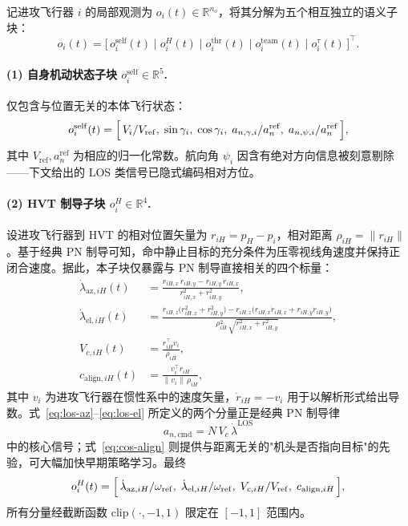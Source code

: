 记进攻飞行器 $i$ 的局部观测为 $o_i(t)\in\mathbb{R}^{n_o}$，将其分解为五个相互独立的语义子块：
\begin{equation}
o_i(t)=\bigl[\,o_i^{\mathrm{self}}(t)\;\big|\;o_i^{H}(t)\;\big|\;o_i^{\mathrm{thr}}(t)\;\big|\;o_i^{\mathrm{team}}(t)\;\big|\;o_i^{\tau}(t)\,\bigr]^{\top}.
\label{eq:obs-decomp}
\end{equation}

\paragraph{(1) 自身机动状态子块 $o_i^{\mathrm{self}}\in\mathbb{R}^{5}$.}
仅包含与位置无关的本体飞行状态：
\begin{equation}
o_i^{\mathrm{self}}(t)=\Bigl[\,V_i/V_{\mathrm{ref}},\;\sin\gamma_i,\;\cos\gamma_i,\;a_{n,\gamma,i}/a^{\mathrm{ref}}_n,\;a_{n,\psi,i}/a^{\mathrm{ref}}_n\,\Bigr],
\label{eq:obs-self}
\end{equation}
其中 $V_{\mathrm{ref}},a^{\mathrm{ref}}_n$ 为相应的归一化常数。航向角 $\psi_i$ 因含有绝对方向信息被刻意剔除——下文给出的 LOS 类信号已隐式编码相对方位。

\paragraph{(2) HVT 制导子块 $o_i^{H}\in\mathbb{R}^{4}$.}
设进攻飞行器到 HVT 的相对位置矢量为 $r_{iH}=p_H-p_i$，相对距离 $\rho_{iH}=\|r_{iH}\|$。基于经典 PN 制导可知，命中静止目标的充分条件为压零视线角速度并保持正闭合速度。据此，本子块仅暴露与 PN 制导直接相关的四个标量：
\begin{align}
\dot\lambda_{\mathrm{az},iH}(t)&=\frac{r_{iH,x}\,\dot r_{iH,y}-r_{iH,y}\,\dot r_{iH,x}}{r_{iH,x}^{2}+r_{iH,y}^{2}},
\label{eq:los-az}\\
\dot\lambda_{\mathrm{el},iH}(t)&=\frac{\dot r_{iH,z}\bigl(r_{iH,x}^{2}+r_{iH,y}^{2}\bigr)
-r_{iH,z}\bigl(r_{iH,x}\dot r_{iH,x}+r_{iH,y}\dot r_{iH,y}\bigr)}{\rho_{iH}^{2}\,\sqrt{r_{iH,x}^{2}+r_{iH,y}^{2}}},
\label{eq:los-el}\\
V_{c,iH}(t)&=\frac{r_{iH}^{\top}v_i}{\rho_{iH}},
\label{eq:vc-h}\\
c_{\mathrm{align},iH}(t)&=\frac{v_i^{\top}r_{iH}}{\|v_i\|\,\rho_{iH}},
\label{eq:cos-align}
\end{align}
其中 $v_i$ 为进攻飞行器在惯性系中的速度矢量，$\dot r_{iH}=-v_i$ 用于以解析形式给出导数。式~\eqref{eq:los-az}--\eqref{eq:los-el} 所定义的两个分量正是经典 PN 制导律
\begin{equation}
a_{n,\mathrm{cmd}}=N\,V_c\,\dot\lambda^{\mathrm{LOS}}
\label{eq:pn}
\end{equation}
中的核心信号；式~\eqref{eq:cos-align} 则提供与距离无关的"机头是否指向目标"的先验，可大幅加快早期策略学习。最终
\begin{equation}
o_i^{H}(t)=\Bigl[\,\dot\lambda_{\mathrm{az},iH}/\omega_{\mathrm{ref}},\;\dot\lambda_{\mathrm{el},iH}/\omega_{\mathrm{ref}},\;V_{c,iH}/V_{\mathrm{ref}},\;c_{\mathrm{align},iH}\,\Bigr],
\end{equation}
所有分量经截断函数 $\mathrm{clip}(\cdot,-1,1)$ 限定在 $[-1,1]$ 范围内。

